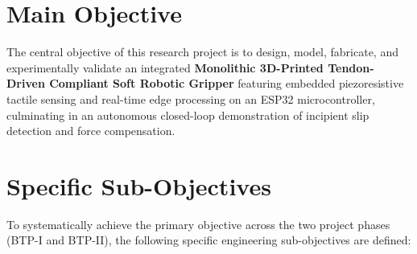 \documentclass[12pt,a4paper]{report}
\begin{document}
\section{Main Objective}
The central objective of this research project is to design, model, fabricate, and experimentally validate an integrated \textbf{Monolithic 3D-Printed Tendon-Driven Compliant Soft Robotic Gripper} featuring embedded piezoresistive tactile sensing and real-time edge processing on an ESP32 microcontroller, culminating in an autonomous closed-loop demonstration of incipient slip detection and force compensation.

\section{Specific Sub-Objectives}
To systematically achieve the primary objective across the two project phases (BTP-I and BTP-II), the following specific engineering sub-objectives are defined:
\end{document}
